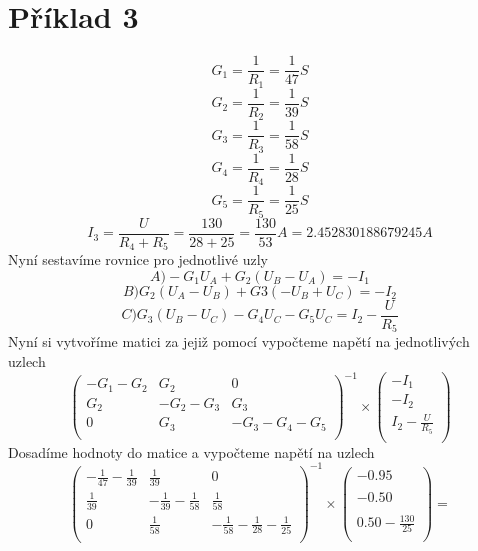 \section{Příklad 3}
\[
  G_1 = \displaystyle\frac{1}{R_1}
  = \displaystyle\frac{1}{47}S
\]
\[
  G_2 = \displaystyle\frac{1}{R_2}
  = \displaystyle\frac{1}{39}S
\]
\[
  G_3 = \displaystyle\frac{1}{R_3}
  = \displaystyle\frac{1}{58}S
\]
\[
  G_4 = \displaystyle\frac{1}{R_4}
  = \displaystyle\frac{1}{28}S
\]
\[
  G_5 = \displaystyle\frac{1}{R_5}
  = \displaystyle\frac{1}{25}S
\]
\[
  I_3 = \displaystyle\frac{U}{R_4 + R_5}
  = \displaystyle\frac{130}{28 + 25}
  = \displaystyle\frac{130}{53}A
  = 2.452830188679245A
\]
 Nyní sestavíme rovnice pro jednotlivé uzly
 \[
   A)-G_1 U_A + G_2 (U_B - U_A ) = -I_1
 \]
 \[
   B)G_2(U_A-U_B)+G3(-U_B+U_C) = -I_2
 \]
 \[
   C)G_3(U_B-U_C)-G_4U_C-G_5U_C = I_2 - \displaystyle\frac{U}{R_5}
 \]
 Nyní si vytvoříme matici za jejiž pomocí vypočteme napětí na jednotlivých uzlech
\[
  \begin{pmatrix}
    -G_1-G_2 & G_2 & 0\\
    G_2 & -G_2-G_3 & G_3\\
    0 & G_3 & -G_3-G_4-G_5\\
  \end{pmatrix}^{-1}
  \times
  \begin{pmatrix}
    -I_1\\
    -I_2\\
    I_2-\displaystyle\frac{U}{R_5}\\
  \end{pmatrix}
\]
Dosadíme hodnoty do matice a vypočteme napětí na uzlech\\
\[
  \begin{pmatrix}
    -\displaystyle\frac{1}{47} -\displaystyle\frac{1}{39} & \displaystyle\frac{1}{39} & 0\\
    \displaystyle\frac{1}{39} & -\displaystyle\frac{1}{39}-\displaystyle\frac{1}{58} & \displaystyle\frac{1}{58}\\
    0 & \displaystyle\frac{1}{58} & -\displaystyle\frac{1}{58}-\displaystyle\frac{1}{28}-\displaystyle\frac{1}{25}\\
  \end{pmatrix}^{-1}
  \times
  \begin{pmatrix}
    -0.95\\
    \\
    -0.50\\
    \\
    0.50-\displaystyle\frac{130}{25}\\
    
  \end{pmatrix}
  =
\]
